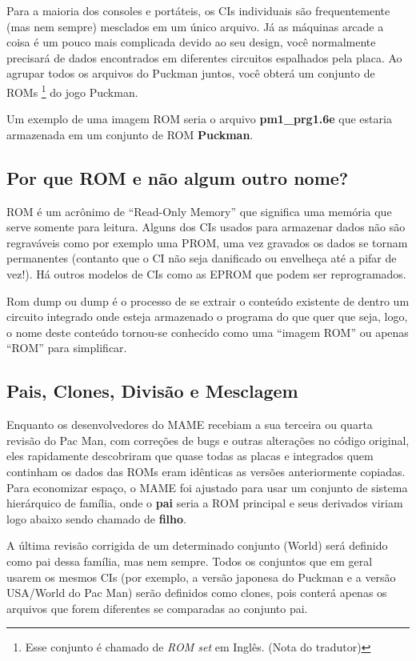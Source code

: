\documentclass[letterpaper,10pt,brazil]{sphinxmanual}
\begin{document}
Para a maioria dos consoles e portáteis, os CIs individuais são
frequentemente (mas nem sempre) mesclados em um único arquivo.
Já as máquinas arcade a coisa é um pouco mais complicada devido ao seu
design, você normalmente precisará de dados encontrados em diferentes
circuitos espalhados pela placa.
Ao agrupar todos os arquivos do Puckman juntos, você obterá um conjunto
de ROMs \footnote[2]{\sphinxAtStartFootnote%
Esse conjunto é chamado de \emph{ROM set} em Inglês.
(Nota do tradutor)
} do jogo Puckman.

Um exemplo de uma imagem ROM seria o arquivo \textbf{pm1\_prg1.6e} que estaria
armazenada em um conjunto de ROM \textbf{Puckman}.


\subsection{Por que ROM e não algum outro nome?}
\label{usingmame/aboutromsets:por-que-rom-e-nao-algum-outro-nome}
ROM é um acrônimo de ``Read-Only Memory'' que significa uma memória que
serve somente para leitura. Alguns dos CIs usados para armazenar dados
não são regraváveis como por exemplo uma PROM, uma vez gravados os dados
se tornam permanentes (contanto que o CI não seja danificado ou
envelheça até a pifar de vez!).
Há outros modelos de CIs como as EPROM que podem ser reprogramados.

Rom dump ou dump é o processo de se extrair o conteúdo existente de
dentro um circuito integrado onde esteja armazenado o programa do que
quer que seja, logo, o nome deste conteúdo tornou-se conhecido como uma
``imagem ROM'' ou apenas ``ROM'' para simplificar.


\subsection{Pais, Clones, Divisão e Mesclagem}
\label{usingmame/aboutromsets:pais-clones-divisao-e-mesclagem}
Enquanto os desenvolvedores do MAME recebiam a sua terceira ou quarta
revisão do Pac Man, com correções de bugs e outras alterações no código
original, eles rapidamente descobriram que quase todas as placas
e integrados quem continham os dados das ROMs eram idênticas as versões
anteriormente copiadas. Para economizar espaço, o MAME foi ajustado para
usar um conjunto de sistema hierárquico de família, onde o \textbf{pai} seria
a ROM principal e seus derivados viriam logo abaixo sendo chamado de
\textbf{filho}.

A última revisão corrigida de um determinado conjunto (World) será
definido como pai dessa família, mas nem sempre.
Todos os conjuntos que em geral usarem os mesmos CIs (por exemplo,
a versão japonesa do Puckman e a versão USA/World do Pac Man) serão
definidos como clones, pois conterá apenas os arquivos que forem
diferentes se comparadas ao conjunto pai.
\end{document}
